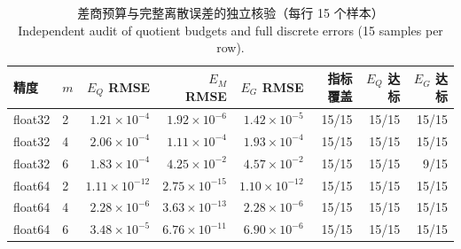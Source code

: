 \begin{table}[H]
\centering
\caption{差商预算与完整离散误差的独立核验（每行 15 个样本）\\Independent audit of quotient budgets and full discrete errors (15 samples per row).}
\label{tab:budget-audit}
\scriptsize
\begin{tabular}{llrrrrrr}
\toprule
精度 & $m$ & $E_Q$ RMSE & $E_M$ RMSE & $E_G$ RMSE & 指标覆盖 & $E_Q$ 达标 & $E_G$ 达标 \\
\midrule
float32 & 2 & $1.21\times10^{-4}$ & $1.92\times10^{-6}$ & $1.42\times10^{-5}$ & 15/15 & 15/15 & 15/15 \\
float32 & 4 & $2.06\times10^{-4}$ & $1.11\times10^{-4}$ & $1.93\times10^{-4}$ & 15/15 & 15/15 & 15/15 \\
float32 & 6 & $1.83\times10^{-4}$ & $4.25\times10^{-2}$ & $4.57\times10^{-2}$ & 15/15 & 15/15 & 9/15 \\
float64 & 2 & $1.11\times10^{-12}$ & $2.75\times10^{-15}$ & $1.10\times10^{-12}$ & 15/15 & 15/15 & 15/15 \\
float64 & 4 & $2.28\times10^{-6}$ & $3.63\times10^{-13}$ & $2.28\times10^{-6}$ & 15/15 & 15/15 & 15/15 \\
float64 & 6 & $3.48\times10^{-5}$ & $6.76\times10^{-11}$ & $6.90\times10^{-6}$ & 15/15 & 15/15 & 15/15 \\
\bottomrule
\end{tabular}
\end{table}
